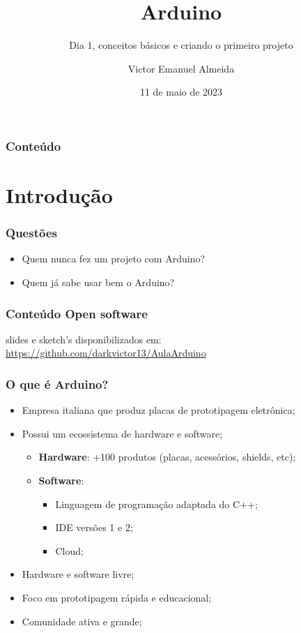 \documentclass[12pt]{beamer}
\author{Victor Emanuel Almeida}
\title{Arduino}
\subtitle{Dia 1, conceitos básicos e criando o primeiro projeto}
\date{11 de maio de 2023}
\institute{UNIOESTE}
\begin{document}
\frame{\titlepage}

\begin{frame}
    \frametitle{Conteúdo}
    \tableofcontents
\end{frame}

\section{Introdução}

\begin{frame}
    \frametitle{Questões}
    \begin{itemize}
        \item Quem nunca fez um projeto com Arduino?
        \item Quem já sabe usar bem o Arduino?
    \end{itemize}
\end{frame}

\begin{frame}
    \frametitle{Conteúdo Open software}
    slides e sketch's disponibilizados em: \url{https://github.com/darkvictor13/AulaArduino}
\end{frame}

\begin{frame}
    \frametitle{O que é Arduino?}

    \begin{itemize}
        \item Empresa italiana que produz placas de prototipagem eletrônica;
        \item Possui um ecossistema de hardware e software;
        \begin{itemize}
            \item\textbf{Hardware}: +100 produtos (placas, acessórios, shields, etc)\cite{site_arduino};
            \item\textbf{Software}:
            \begin{itemize}
                \item Linguagem de programação adaptada do C++;
                \item IDE versões 1 e 2;
                \item Cloud;
            \end{itemize}
        \end{itemize}
        \item Hardware e software livre;
        \item Foco em prototipagem rápida e educacional;
        \item Comunidade ativa e grande;
    \end{itemize}
\end{frame}
\end{document}
